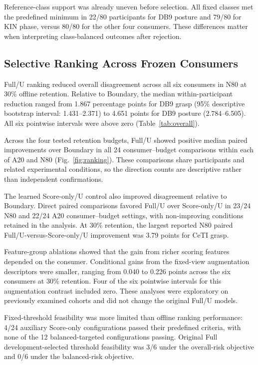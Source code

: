 Reference-class support was already uneven before selection. All fixed classes met the predefined minimum in 22/80 participants for DB9 posture and 79/80 for KIN phase, versus 80/80 for the other four consumers. These differences matter when interpreting class-balanced outcomes after rejection.

\subsection{Selective Ranking Across Frozen Consumers}\label{selective-ranking-across-frozen-consumers}
Full/U ranking reduced overall disagreement across all six consumers in N80 at 30\% offline retention. Relative to Boundary, the median within-participant reduction ranged from 1.867 percentage points for DB9 grasp (95\% descriptive bootstrap interval: 1.431--2.371) to 4.651 points for DB9 posture (2.784--6.505). All six pointwise intervals were above zero (Table~\ref{tab:overall}).

Across the four tested retention budgets, Full/U showed positive median paired improvements over Boundary in all 24 consumer--budget comparisons within each of A20 and N80 (Fig.~\ref{fig:ranking}). These comparisons share participants and related experimental conditions, so the direction counts are descriptive rather than independent confirmations.

The learned Score-only/U control also improved disagreement relative to Boundary. Direct paired comparisons favored Full/U over Score-only/U in 23/24 N80 and 22/24 A20 consumer--budget settings, with non-improving conditions retained in the analysis. At 30\% retention, the largest reported N80 paired Full/U-versus-Score-only/U improvement was 3.79 points for CeTI grasp.



Feature-group ablations showed that the gain from richer scoring features depended on the consumer. Conditional gains from the fixed-view augmentation descriptors were smaller, ranging from 0.040 to 0.226 points across the six consumers at 30\% retention. Four of the six pointwise intervals for this augmentation contrast included zero. These analyses were exploratory on previously examined cohorts and did not change the original Full/U models.

Fixed-threshold feasibility was more limited than offline ranking performance: 4/24 auxiliary Score-only configurations passed their predefined criteria, with none of the 12 balanced-targeted configurations passing. Original Full development-selected threshold feasibility was 3/6 under the overall-risk objective and 0/6 under the balanced-risk objective.



